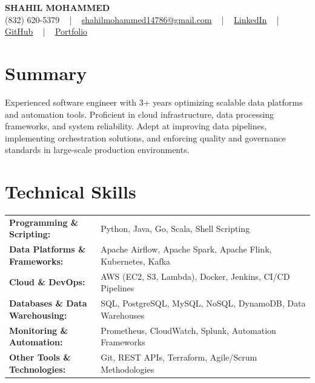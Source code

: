 \documentclass[letterpaper,11pt]{article}
\begin{document}
\begin{center}
    {\fontsize{14pt}{12pt}\selectfont \textbf{\MakeUppercase{Shahil Mohammed}}}\\ \vspace{2pt}
    \fontsize{10pt}{12pt}\selectfont (832) 620-5379 ~ | ~ \href{mailto:shahilmohammed14786@gmail.com}{shahilmohammed14786@gmail.com} ~ | ~  
    \href{https://www.linkedin.com/in/shahil-mohammed-9652931a1/}{\color{blue}\underline{LinkedIn}}  ~ | ~ 
    \href{https://github.com/freakbeast14}{\color{blue}\underline{GitHub}} ~ | ~ 
    \href{https://shahil-mohammed.netlify.app/}{\color{blue}\underline{Portfolio}}
    \vspace{-8pt}
\end{center}

\section{Summary}
\fontsize{9pt}{10pt}\selectfont
Experienced software engineer with 3+ years optimizing scalable data platforms and automation tools. Proficient in cloud infrastructure, data processing frameworks, and system reliability. Adept at improving data pipelines, implementing orchestration solutions, and enforcing quality and governance standards in large-scale production environments.
\vspace{-5pt}
 
\section{Technical Skills}
        \vspace{-14pt}
        \begin{table}[h]
            \fontsize{9pt}{10pt}\selectfont
            \begin{tabular}{p{0.3\linewidth} p{0.7\linewidth}}
                \textbf{Programming \& Scripting:} & Python, Java, Go, Scala, Shell Scripting \\
                \textbf{Data Platforms \& Frameworks:} & Apache Airflow, Apache Spark, Apache Flink, Kubernetes, Kafka \\
                \textbf{Cloud \& DevOps:} & AWS (EC2, S3, Lambda), Docker, Jenkins, CI/CD Pipelines \\
                \textbf{Databases \& Data Warehousing:} & SQL, PostgreSQL, MySQL, NoSQL, DynamoDB, Data Warehouses \\
                \textbf{Monitoring \& Automation:} & Prometheus, CloudWatch, Splunk, Automation Frameworks \\
                \textbf{Other Tools \& Technologies:} & Git, REST APIs, Terraform, Agile/Scrum Methodologies \\
            \end{tabular}
        \end{table}
 \vspace{-15pt}
 
\end{document}
